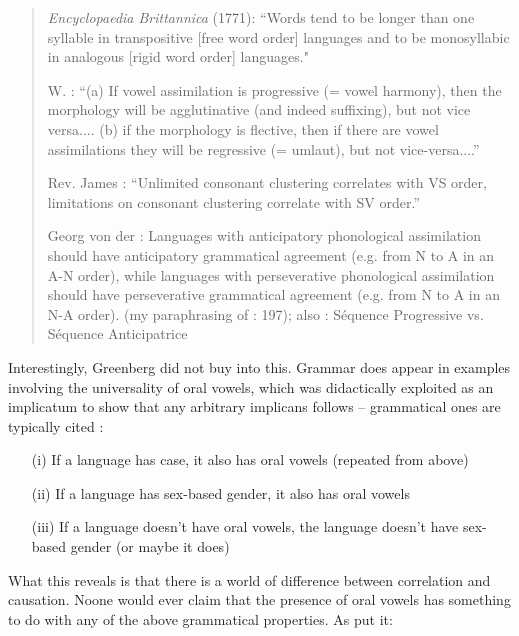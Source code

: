 \documentclass[output=paper]{langsci/langscibook}
\begin{document}
\begin{quote}
  \textit{Encyclopaedia Brittannica} (1771): “Words tend to be longer than one syllable in transpositive [free word order] languages and to be monosyllabic in analogous [rigid word order] languages." \citep[198]{Plank1998}
  
  W. \citet{Radioff1882}: “(a) If vowel assimilation is progressive (= vowel harmony), then the morphology will be agglutinative (and indeed suffixing), but not vice versa.... (b) if the morphology is flective, then if there are vowel assimilations they will be regressive (= umlaut), but not vice-versa....” \citep[202]{Plank1998}

  \newpage 
  Rev. James \citet{Byrne1885}: “Unlimited consonant clustering correlates with VS order, limitations on consonant clustering correlate with SV order.” \citep[200]{Plank1998}

  Georg von der \citet{Gabelentz1901}: Languages with anticipatory phonological assimilation should have anticipatory grammatical agreement (e.g. from N to A in an A-N order), while languages with perseverative phonological assimilation should have perseverative grammatical agreement (e.g. from N to A in an N-A order). (my paraphrasing of \citealt{Plank1998}: 197); also \citet{Bally1944}: Séquence Progressive vs. Séquence Anticipatrice \citep[211]{Plank1998}
\end{quote}


Interestingly, Greenberg did not buy into this. Grammar does appear in examples involving the universality of oral vowels, which was didactically exploited as an implicatum to show that any arbitrary implicans follows -- grammatical ones are typically cited \citep{Greenberg1966phonology,Greenberg1978b}:
\begin{itemize}
 \item[(i)]  If a language has case, it also has oral vowels (repeated from above)
 \item[(ii)]  If a language has sex-based gender, it also has oral vowels
 \item[(iii)]  If a language doesn’t have oral vowels, the language doesn’t have sex-based gender (or maybe it does)
\end{itemize}
  

 What this reveals is that there is a world of difference between correlation and causation. Noone would ever claim that the presence of oral vowels has something to do with any of the above grammatical properties. As \citet{Plank1998} put it:
\end{document}
